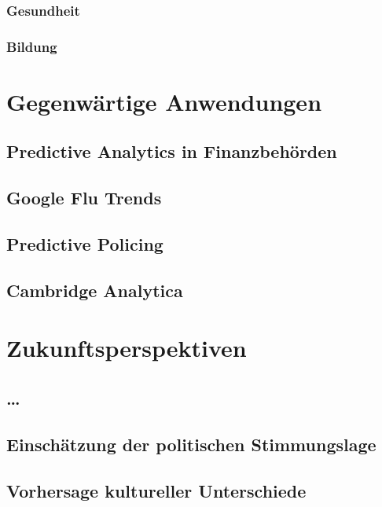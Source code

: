 \documentclass[12pt,a4paper,listof=totoc,oneside]{scrreprt}
\begin{document}
\subsection{Gesundheit}

\subsection{Bildung}

\chapter{Gegenwärtige Anwendungen}

\section{Predictive Analytics in Finanzbehörden}

\section{Google Flu Trends}

\section{Predictive Policing}

\section{Cambridge Analytica}


\chapter{Zukunftsperspektiven}

\section{\ldots}

\section{Einschätzung der politischen Stimmungslage}

\section{Vorhersage kultureller Unterschiede}
\end{document}
